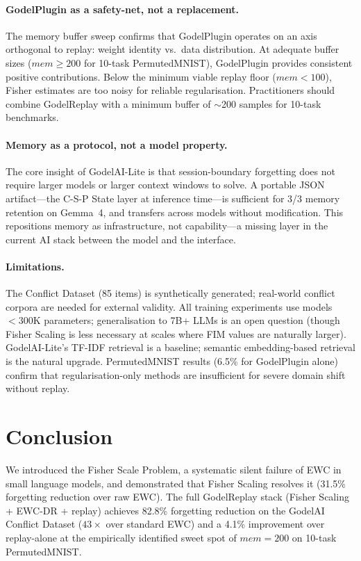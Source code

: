 \documentclass[12pt]{article}
\newcommand{\godelreplay}{GodelReplay\xspace}
\begin{document}
\paragraph{GodelPlugin as a safety-net, not a replacement.}
The memory buffer sweep confirms that GodelPlugin operates on an axis orthogonal
to replay: weight identity vs.\ data distribution.
At adequate buffer sizes ($\mathit{mem}{\geq}200$ for 10-task PermutedMNIST),
GodelPlugin provides consistent positive contributions.
Below the minimum viable replay floor ($\mathit{mem}{<}100$), Fisher estimates
are too noisy for reliable regularisation.
Practitioners should combine \godelreplay with a minimum buffer of
$\sim$200 samples for 10-task benchmarks.

\paragraph{Memory as a protocol, not a model property.}
The core insight of GodelAI-Lite is that session-boundary forgetting does not
require larger models or larger context windows to solve.
A portable JSON artifact---the C-S-P State layer at inference time---is
sufficient for 3/3 memory retention on Gemma~4, and transfers across models
without modification.
This repositions memory as infrastructure, not capability---a missing layer
in the current AI stack between the model and the interface.

\paragraph{Limitations.}
The Conflict Dataset (85 items) is synthetically generated; real-world conflict
corpora are needed for external validity.
All training experiments use models $<300$K parameters; generalisation to 7B+
LLMs is an open question (though Fisher Scaling is less necessary at scales
where FIM values are naturally larger).
GodelAI-Lite's TF-IDF retrieval is a baseline; semantic embedding-based
retrieval is the natural upgrade.
PermutedMNIST results (6.5\% for GodelPlugin alone) confirm that
regularisation-only methods are insufficient for severe domain shift without
replay.

\section{Conclusion}
\label{sec:conclusion}

We introduced the Fisher Scale Problem, a systematic silent failure of EWC in
small language models, and demonstrated that Fisher Scaling resolves it
(31.5\% forgetting reduction over raw EWC). The full \godelreplay stack
(Fisher Scaling + EWC-DR + replay) achieves 82.8\% forgetting reduction on
the GodelAI Conflict Dataset ($43\times$ over standard EWC) and a 4.1\%
improvement over replay-alone at the empirically identified sweet spot of
$\mathit{mem}{=}200$ on 10-task PermutedMNIST.
\end{document}
